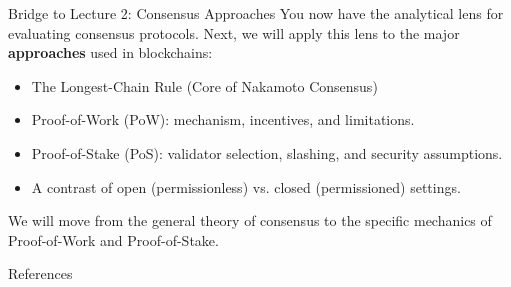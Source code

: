 \documentclass[aspectratio=169]{beamer}
\begin{document}
\begin{frame}{Bridge to Lecture 2: Consensus Approaches}
    You now have the analytical lens for evaluating consensus protocols. Next, we will apply this lens to the major \textbf{approaches} used in blockchains:
    \begin{itemize}
        \item The Longest-Chain Rule (Core of Nakamoto Consensus)
        \item Proof-of-Work (PoW): mechanism, incentives, and limitations.
        \item Proof-of-Stake (PoS): validator selection, slashing, and security assumptions.
        \item A contrast of open (permissionless) vs. closed (permissioned) settings.
    \end{itemize}
    \vfill
    \begin{tcolorbox}[enhanced, colback=red!20, colframe=red!75!black, fonttitle=\bfseries, title={Coming Up Next}, rounded corners, drop shadow]
    We will move from the general theory of consensus to the specific mechanics of Proof-of-Work and Proof-of-Stake.
    \end{tcolorbox}
\end{frame}

\begin{frame}[allowframebreaks]{References}
    
\end{frame}
\end{document}

